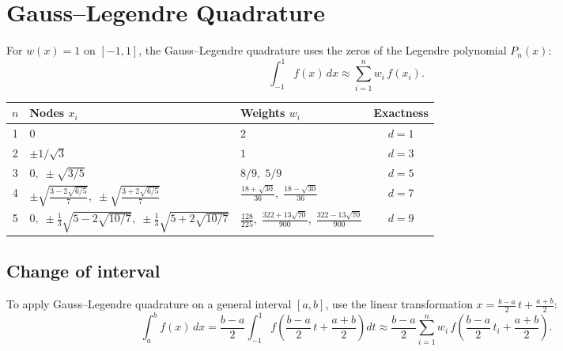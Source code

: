 \section{Gauss--Legendre Quadrature}

\begin{definition}
\label{def:gauss-legendre}
For $w(x) = 1$ on $[-1,1]$, the Gauss--Legendre quadrature uses the zeros of the Legendre polynomial $P_n(x)$:
\[
    \int_{-1}^{1} f(x)\,dx \approx \sum_{i=1}^{n} w_i\, f(x_i).
\]
\end{definition}

\begin{example}
\label{ex:gauss-legendre-table}
\begin{center}
\begin{tabular}{c|l|l|c}
    \toprule
    $n$ & Nodes $x_i$ & Weights $w_i$ & Exactness \\
    \midrule
    1 & $0$ & $2$ & $d = 1$ \\[4pt]
    2 & $\pm 1/\sqrt{3}$ & $1$ & $d = 3$ \\[4pt]
    3 & $0, \;\pm\sqrt{3/5}$ & $8/9, \;5/9$ & $d = 5$ \\[4pt]
    4 & $\pm\sqrt{\frac{3-2\sqrt{6/5}}{7}}, \;\pm\sqrt{\frac{3+2\sqrt{6/5}}{7}}$ & $\frac{18+\sqrt{30}}{36}, \;\frac{18-\sqrt{30}}{36}$ & $d = 7$ \\[4pt]
    5 & $0, \;\pm\frac{1}{3}\sqrt{5-2\sqrt{10/7}}, \;\pm\frac{1}{3}\sqrt{5+2\sqrt{10/7}}$ & $\frac{128}{225}, \;\frac{322+13\sqrt{70}}{900}, \;\frac{322-13\sqrt{70}}{900}$ & $d = 9$ \\
    \bottomrule
\end{tabular}
\end{center}
\end{example}

\subsection{Change of interval}

\begin{proposition}
\label{prop:interval-change}
To apply Gauss--Legendre quadrature on a general interval $[a,b]$, use the linear transformation $x = \frac{b-a}{2}\,t + \frac{a+b}{2}$:
\[
    \int_a^b f(x)\,dx = \frac{b-a}{2}\int_{-1}^{1} f\!\left(\frac{b-a}{2}\,t + \frac{a+b}{2}\right)dt \approx \frac{b-a}{2}\sum_{i=1}^{n} w_i\, f\!\left(\frac{b-a}{2}\,t_i + \frac{a+b}{2}\right).
\]
\end{proposition}

